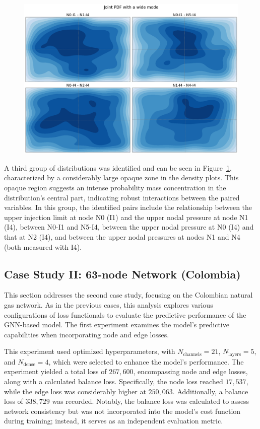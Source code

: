 \begin{figure}
    \begin{center}
        \includegraphics[width=.7\textwidth]{figures/Chapter_NonLinealCensnet/PDF_inputs_inputs_wide_mode.png}
    \end{center}
    \caption{}\label{fig:joint_distributions_input_input_wide_mode}
\end{figure}
 

A third group of distributions was identified and can be seen in Figure~\cref{fig:joint_distributions_input_input_wide_mode}, characterized by a considerably large opaque zone in the density plots. This opaque region suggests an intense probability mass concentration in the distribution's central part, indicating robust interactions between the paired variables. In this group, the identified pairs include the relationship between the upper injection limit at node N0 (I1) and the upper nodal pressure at node N1 (I4), between N0-I1 and N5-I4, between the upper nodal pressure at N0 (I4) and that at N2 (I4), and between the upper nodal pressures at nodes N1 and N4 (both measured with I4).







\subsection{Case Study II: 63-node Network (Colombia)}


This section addresses the second case study, focusing on the Colombian natural gas network. As in the previous cases, this analysis explores various configurations of loss functionals to evaluate the predictive performance of the GNN-based model. The first experiment examines the model's predictive capabilities when incorporating node and edge losses.


This experiment used optimized hyperparameters, with \( N_{\text{channels}} = 21 \), \( N_{\text{layers}} = 5 \), and \( N_{\text{dense}} = 4 \), which were selected to enhance the model's performance. The experiment yielded a total loss of \( 267,600 \), encompassing node and edge losses, along with a calculated balance loss. Specifically, the node loss reached \( 17,537 \), while the edge loss was considerably higher at \( 250,063 \). Additionally, a balance loss of \( 338,729 \) was recorded. Notably, the balance loss was calculated to assess network consistency but was not incorporated into the model's cost function during training; instead, it serves as an independent evaluation metric. 

